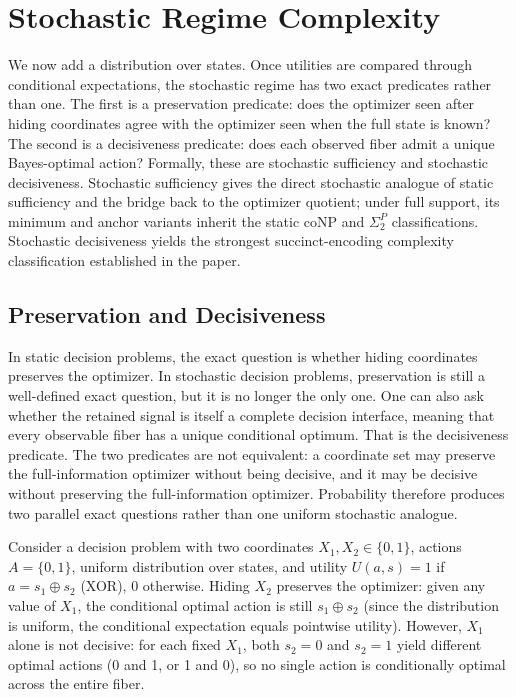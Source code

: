 \section{Stochastic Regime Complexity}\label{sec:stochastic}

We now add a distribution over states. Once utilities are compared through conditional expectations, the stochastic regime has two exact predicates rather than one. The first is a preservation predicate: does the optimizer seen after hiding coordinates agree with the optimizer seen when the full state is known? The second is a decisiveness predicate: does each observed fiber admit a unique Bayes-optimal action? Formally, these are stochastic sufficiency and stochastic decisiveness. Stochastic sufficiency gives the direct stochastic analogue of static sufficiency and the bridge back to the optimizer quotient; under full support, its minimum and anchor variants inherit the static coNP and $\Sigma_2^P$ classifications. Stochastic decisiveness yields the strongest succinct-encoding complexity classification established in the paper.

\subsection{Preservation and Decisiveness}

In static decision problems, the exact question is whether hiding coordinates preserves the optimizer. In stochastic decision problems, preservation is still a well-defined exact question, but it is no longer the only one. One can also ask whether the retained signal is itself a complete decision interface, meaning that every observable fiber has a unique conditional optimum. That is the decisiveness predicate. The two predicates are not equivalent: a coordinate set may preserve the full-information optimizer without being decisive, and it may be decisive without preserving the full-information optimizer. Probability therefore produces two parallel exact questions rather than one uniform stochastic analogue.

\begin{example}
Consider a decision problem with two coordinates $X_1,X_2 \in \{0,1\}$, actions $A=\{0,1\}$, uniform distribution over states, and utility $U(a,s)=1$ if $a = s_1 \oplus s_2$ (XOR), 0 otherwise. Hiding $X_2$ preserves the optimizer: given any value of $X_1$, the conditional optimal action is still $s_1 \oplus s_2$ (since the distribution is uniform, the conditional expectation equals pointwise utility). However, $X_1$ alone is not decisive: for each fixed $X_1$, both $s_2=0$ and $s_2=1$ yield different optimal actions (0 and 1, or 1 and 0), so no single action is conditionally optimal across the entire fiber.
\end{example}

